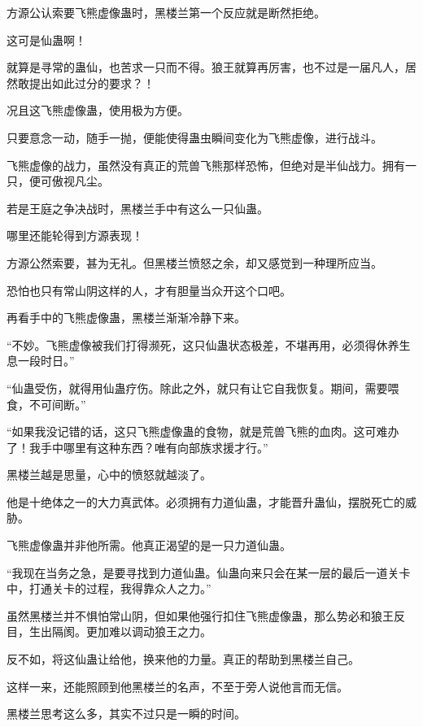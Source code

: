 
\begin{this_body}



方源公认索要飞熊虚像蛊时，黑楼兰第一个反应就是断然拒绝。

这可是仙蛊啊！

就算是寻常的蛊仙，也苦求一只而不得。狼王就算再厉害，也不过是一届凡人，居然敢提出如此过分的要求？！

况且这飞熊虚像蛊，使用极为方便。

只要意念一动，随手一抛，便能使得蛊虫瞬间变化为飞熊虚像，进行战斗。

飞熊虚像的战力，虽然没有真正的荒兽飞熊那样恐怖，但绝对是半仙战力。拥有一只，便可傲视凡尘。

若是王庭之争决战时，黑楼兰手中有这么一只仙蛊。

哪里还能轮得到方源表现！

方源公然索要，甚为无礼。但黑楼兰愤怒之余，却又感觉到一种理所应当。

恐怕也只有常山阴这样的人，才有胆量当众开这个口吧。

再看手中的飞熊虚像蛊，黑楼兰渐渐冷静下来。

“不妙。飞熊虚像被我们打得濒死，这只仙蛊状态极差，不堪再用，必须得休养生息一段时日。”

“仙蛊受伤，就得用仙蛊疗伤。除此之外，就只有让它自我恢复。期间，需要喂食，不可间断。”

“如果我没记错的话，这只飞熊虚像蛊的食物，就是荒兽飞熊的血肉。这可难办了！我手中哪里有这种东西？唯有向部族求援才行。”

黑楼兰越是思量，心中的愤怒就越淡了。

他是十绝体之一的大力真武体。必须拥有力道仙蛊，才能晋升蛊仙，摆脱死亡的威胁。

飞熊虚像蛊并非他所需。他真正渴望的是一只力道仙蛊。

“我现在当务之急，是要寻找到力道仙蛊。仙蛊向来只会在某一层的最后一道关卡中，打通关卡的过程，我得靠众人之力。”

虽然黑楼兰并不惧怕常山阴，但如果他强行扣住飞熊虚像蛊，那么势必和狼王反目，生出隔阂。更加难以调动狼王之力。

反不如，将这仙蛊让给他，换来他的力量。真正的帮助到黑楼兰自己。

这样一来，还能照顾到他黑楼兰的名声，不至于旁人说他言而无信。

黑楼兰思考这么多，其实不过只是一瞬的时间。


\end{this_body}
